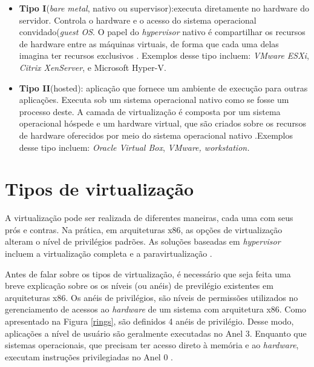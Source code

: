 \begin{itemize}
\item \textbf{Tipo I}(\textit{bare metal}, nativo ou supervisor):executa diretamente no hardware do servidor. Controla o hardware e o acesso do sistema operacional convidado(\textit{guest OS}. O papel do \textit{hypervisor} nativo é compartilhar os recursos de hardware entre as máquinas virtuais, de forma que cada uma delas imagina ter recursos exclusivos \cite{manoel}. Exemplos desse tipo incluem: \textit{VMware ESXi}, \textit{Citrix XenServer}, e {Microsoft Hyper-V.}

\item \textbf{Tipo II}(hosted): aplicação que fornece um ambiente de execução para outras aplicações. Executa sob um sistema operacional nativo como se fosse um processo deste. A camada de virtualização é composta por um sistema operacional hóspede e um hardware virtual, que são criados sobre os recursos de hardware oferecidos por meio do sistema operacional nativo \cite{manoel}.Exemplos desse tipo incluem: \textit{Oracle Virtual Box}, \textit{VMware, workstation.}
\end{itemize}

\section{Tipos de virtualização}
A virtualização pode ser realizada de diferentes maneiras, cada uma com seus prós e contras. Na prática, em arquiteturas x86, as opções de virtualização alteram o nível de privilégios padrões. As soluções baseadas em \textit{hypervisor} incluem a virtualização completa e a paravirtualização \cite{manoel}.

Antes de falar sobre os tipos de virtualização, é necessário que seja feita uma breve explicação sobre os os níveis (ou anéis) de previlégio existentes em arquiteturas x86. Os anéis de privilégios, são níveis de permissões utilizados no gerenciamento de acessos ao \textit{hardware} de um sistema com arquitetura x86. Como apresentado na Figura \ref{rings}, são definidos 4 anéis de privilégio. Desse modo, aplicações a nível de usuário são geralmente executadas no Anel 3. Enquanto que sistemas operacionais, que precisam ter acesso direto à memória e ao \textit{hardware}, executam instruções privilegiadas no Anel 0 \cite{vmware}. 

